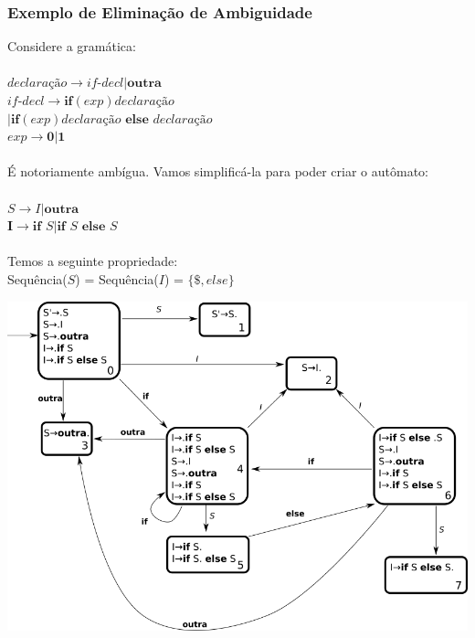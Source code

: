 \documentclass[table]{beamer}
\begin{document}
\begin{frame}
   \frametitle{Exemplo de Eliminação de Ambiguidade}
   Considere a gramática: \\
   \\
   $\textit{declaração}\to \textit{if-decl}|\textbf{outra}$ \\
   $\textit{if-decl} \to \textbf{if}(exp) \textit{declaração}$ \\
   $|\textbf{if}(exp)\textit{declaração }\textbf{else }\textit{declaração}$ \\
   $exp\to\textbf{0}|\textbf{1}$ \\
   \\
   É notoriamente ambígua. Vamos simplificá-la para poder criar o autômato: \\
   \\
   $S\to I|\textbf{outra}$ \\
   $\textbf{I}\to\textbf{if }S|\textbf{if }S\textbf{ else }S$ \\
   \\
   Temos a seguinte propriedade: \\
   Sequência($S$) = Sequência($I$) = $\{\$, else\}$
\end{frame}

\begin{frame}
   \includegraphics[width=\linewidth,height=\textheight,keepaspectratio]{figuras/ifthenelsedfa.png}
\end{frame}
\end{document}
